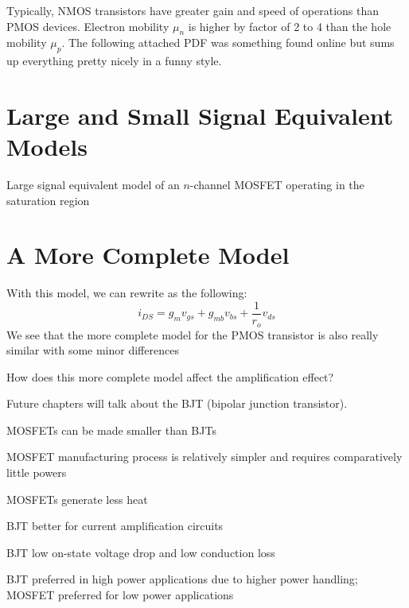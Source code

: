 Typically, NMOS transistors have greater gain and speed of operations than PMOS devices. Electron mobility $\mu_n$ is higher by factor of 2 to 4 than the hole mobility $\mu_p$. The following attached PDF was something found online but sums up everything pretty nicely in a funny style.

\newpage %
% 


\section{Large and Small Signal Equivalent Models}
Large signal equivalent model of an $n$-channel MOSFET operating in the saturation region


\section{A More Complete Model}



With this model, we can rewrite \ids as the following:
    \[i_{DS} = g_m v_{gs} + g_{mb} v_{bs} + \frac{1}{r_o} v_{ds}\]
We see that the more complete model for the PMOS transistor is also really similar with some minor differences



How does this more complete model affect the amplification effect?

Future chapters will talk about the BJT (bipolar junction transistor). 
\begin{pline}
    \item MOSFETs can be made smaller than BJTs
    \item MOSFET manufacturing process is relatively simpler and requires comparatively little powers
    \item MOSFETs generate less heat
    \item BJT better for current amplification circuits
    \item BJT low on-state voltage drop and low conduction loss
    \item BJT preferred in high power applications due to higher power handling; MOSFET preferred for low power applications
\end{pline}


